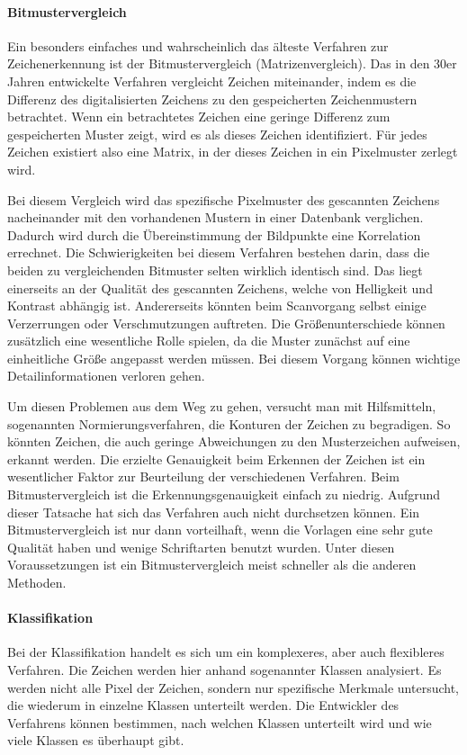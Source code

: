 \paragraph{Bitmustervergleich}
Ein besonders einfaches und wahrscheinlich das älteste Verfahren zur Zeichenerkennung ist der Bitmustervergleich (Matrizenvergleich). Das in den 30er Jahren entwickelte Verfahren vergleicht Zeichen miteinander, indem es die Differenz des digitalisierten Zeichens zu den gespeicherten Zeichenmustern betrachtet. Wenn ein betrachtetes Zeichen eine geringe Differenz zum gespeicherten Muster zeigt, wird es als dieses Zeichen identifiziert. Für jedes Zeichen existiert also eine Matrix, in der dieses Zeichen in ein Pixelmuster zerlegt wird.


Bei diesem Vergleich wird das spezifische Pixelmuster des gescannten Zeichens nacheinander mit den vorhandenen Mustern in einer Datenbank verglichen. Dadurch wird durch die Übereinstimmung der Bildpunkte eine Korrelation errechnet. Die Schwierigkeiten bei diesem Verfahren bestehen darin, dass die beiden zu vergleichenden Bitmuster selten wirklich identisch sind. Das liegt einerseits an der Qualität des gescannten Zeichens, welche von Helligkeit und Kontrast abhängig ist. Andererseits könnten beim Scanvorgang selbst einige Verzerrungen oder Verschmutzungen auftreten. Die Größenunterschiede können zusätzlich eine wesentliche Rolle spielen, da die Muster zunächst auf eine einheitliche Größe angepasst werden müssen. Bei diesem Vorgang können wichtige Detailinformationen verloren gehen.

Um diesen Problemen aus dem Weg zu gehen, versucht man mit Hilfsmitteln, sogenannten Normierungsverfahren, die Konturen der Zeichen zu begradigen. So könnten Zeichen, die auch geringe Abweichungen zu den Musterzeichen aufweisen, erkannt werden. Die erzielte Genauigkeit beim Erkennen der Zeichen ist ein wesentlicher Faktor zur Beurteilung der verschiedenen Verfahren. Beim Bitmustervergleich ist die Erkennungsgenauigkeit einfach zu niedrig. Aufgrund dieser Tatsache hat sich das Verfahren auch nicht durchsetzen können. Ein Bitmustervergleich ist nur dann vorteilhaft, wenn die Vorlagen eine sehr gute Qualität haben und wenige Schriftarten benutzt wurden. Unter diesen Voraussetzungen ist ein Bitmustervergleich meist schneller als die anderen Methoden.

\paragraph{Klassifikation}
Bei der Klassifikation handelt es sich um ein komplexeres, aber auch flexibleres Verfahren. Die Zeichen werden hier anhand sogenannter Klassen analysiert. Es werden nicht alle Pixel der Zeichen, sondern nur spezifische Merkmale untersucht, die wiederum in einzelne Klassen unterteilt werden. Die Entwickler des Verfahrens können bestimmen, nach welchen Klassen unterteilt wird und wie viele Klassen es überhaupt gibt.

